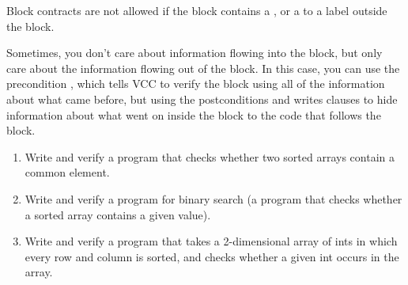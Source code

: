 Block contracts are not allowed if the block contains a ,
or a  to a label outside the block.

Sometimes, you don't care about information flowing into the block,
but only care about the information flowing out of the block. In this
case, you can use the precondition ,
which tells VCC to verify the block using all of the information about
what came before, but using the postconditions and writes clauses to
hide information about what went on inside the block to the code that
follows the block.

\begin{enumerate}
\item
Write and verify a program that checks whether two sorted arrays
contain a common element.
\item
Write and verify a program for binary search (a program
that checks whether a sorted array contains a given value).

\item 
Write and verify a program that takes a 2-dimensional array of ints in
which every row and column is sorted, and checks whether a given int
occurs in the array.
\end{enumerate}

